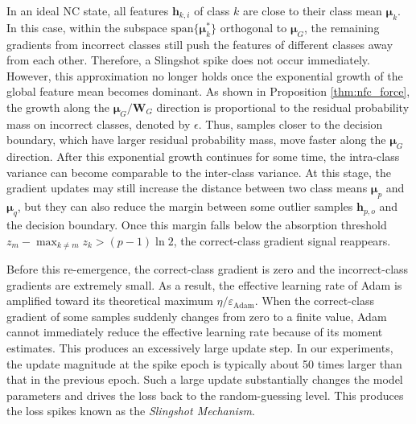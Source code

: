 \documentclass{article}
\theoremstyle{plain}
\theoremstyle{definition}
\theoremstyle{remark}
\begin{document}
In an ideal NC state, all features $\bm{h}_{k,i}$ of class $k$ are close to their class mean $\bm{\mu}_k$. 
In this case, within the subspace $\text{span}\{\bm{\mu}_k^*\}$ orthogonal to $\bm{\mu}_G$, 
the remaining gradients from incorrect classes still push the features of different classes away from each other. 
Therefore, a Slingshot spike does not occur immediately. 
However, this approximation no longer holds once the exponential growth of the global feature mean becomes dominant. 
As shown in Proposition \ref{thm:nfc_force}, the growth along the $\bm{\mu}_G / \bm{W}_G$ direction is proportional to 
the residual probability mass on incorrect classes, denoted by $\epsilon$. 
Thus, samples closer to the decision boundary, which have larger residual probability mass, 
move faster along the $\bm{\mu}_G$ direction. After this exponential growth continues for some time, 
the intra-class variance can become comparable to the inter-class variance. 
At this stage, the gradient updates may still increase the distance between two class means $\bm{\mu}_p$ and $\bm{\mu}_q$, 
but they can also reduce the margin between some outlier samples $\bm{h}_{p,o}$ and the decision boundary. 
Once this margin falls below the absorption threshold $z_m - \max_{k \neq m} z_k > (p - 1) \ln 2$, 
the correct-class gradient signal reappears.

Before this re-emergence, the correct-class gradient is zero and the incorrect-class gradients are extremely small. 
As a result, the effective learning rate of Adam is amplified toward its theoretical maximum $\eta / \varepsilon_\text{Adam}$. 
When the correct-class gradient of some samples suddenly changes from zero to a finite value, 
Adam cannot immediately reduce the effective learning rate because of its moment estimates. 
This produces an excessively large update step. In our experiments, 
the update magnitude at the spike epoch is typically about 50 times larger than that in the previous epoch. 
Such a large update substantially changes the model parameters and drives the loss back to the random-guessing level. 
This produces the loss spikes known as the \emph{Slingshot Mechanism}.

\end{document}
